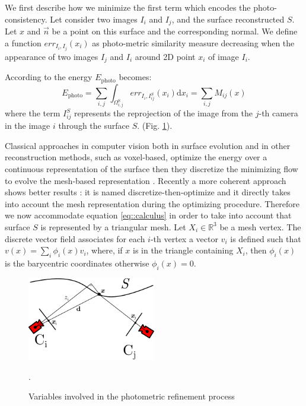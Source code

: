 We first describe how we minimize the first term which encodes the photo-consistency.
Let consider two images $I_i$ and $I_j$, and the surface reconstructed $\mathit{S}$. Let $x$ and $\overrightarrow{n}$ be a point on this surface and the corresponding normal. We define a function $err_{I_i, I_j}(x_i)$ as photo-metric similarity measure decreasing when the appearance of two images $I_j$ and $I_i$ around 2D point $x_i$ of image $I_i$.

According to \cite{pons2007multi} the energy $E_{\textrm{photo}}$ becomes:
\begin{equation}
\label{eq:energy_photo}
  E_{\textrm{photo}} = \sum_{i,j}\int_{\Omega^{\textrm{S}}_{i,j}} err_{I_i, I_{ij}^{\mathit{S}}}(x_i)\textrm{d}x_i = \sum_{i,j} \mathit{M}_{ij}(x)
\end{equation}
where the term $I_{ij}^{\mathit{S}}$ represents the reprojection of the image from the $j$-th camera in the image $i$ through the surface $\mathit{S}$.
(Fig. \ref{fig:cameraproj}).

Classical approaches in computer vision both in surface evolution and in other reconstruction methods, such as voxel-based, optimize the energy over a continuous representation of the surface then they discretize the minimizing flow to evolve the mesh-based representation \cite{pons2007multi,faugeras2002variational}. Recently a more coherent approach shows better results \cite{vu_et_al_2012,delaunoy_et_al_08}: it is named discretize-then-optimize and it directly takes into account the mesh representation during the optimizing procedure. 
Therefore we now accommodate equation \eqref{eq::calculus} in order to take into account that  surface $\mathit{S}$ is represented by a triangular mesh. 
Let $X_i \in \mathbb{R}^3$ be a mesh vertex. The discrete vector field associates for each $i$-th vertex a vector $v_i$ is defined such that $v(x) = \sum_i \phi_i(x) v_i$, where, if $x$ is in the triangle containing $X_i$, then $\phi_i(x)$ is the barycentric coordinates otherwise $\phi_i(x) = 0$.


\begin{figure}[t]
\centering
\includegraphics[width=0.5\textwidth]{./img/ch-incr-dens/cameproj}
\label{fig:cameraproj}
\caption{Variables involved in the photometric refinement process}.
\end{figure}

